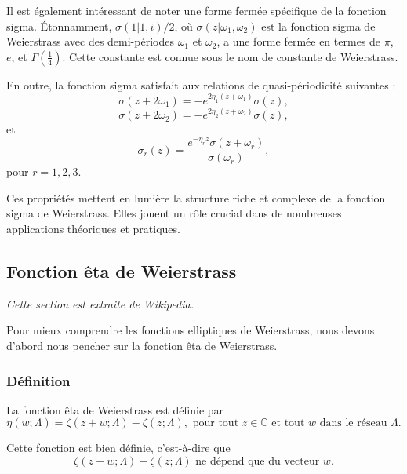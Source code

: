 \documentclass[12pt]{article}
\begin{document}
                        Il est également intéressant de noter une forme fermée spécifique de la fonction sigma. Étonnamment, $\sigma (1 | 1, i)/2$, où $\sigma (z | \omega_1, \omega_2)$ est la fonction sigma de Weierstrass avec des demi-périodes $\omega_1$ et $\omega_2$, a une forme fermée en termes de $\pi$, $e$, et $\Gamma \left( \frac{1}{4} \right)$. Cette constante est connue sous le nom de constante de Weierstrass.

                        En outre, la fonction sigma satisfait aux relations de quasi-périodicité suivantes :
                        \[
                        \sigma (z + 2 \omega_1) = -e^{2 \eta_1 (z + \omega_1)} \sigma (z), \tag{4}
                        \]
                        \[
                        \sigma (z + 2 \omega_2) = -e^{2 \eta_2 (z + \omega_2)} \sigma (z), \tag{5}
                        \]
                        et
                        \[
                        \sigma_r (z) = \frac{e^{-\eta_r z} \sigma (z + \omega_r)}{\sigma (\omega_r)}, \tag{6}
                        \]
                        pour $r = 1, 2, 3$.

                        Ces propriétés mettent en lumière la structure riche et complexe de la fonction sigma de Weierstrass. Elles jouent un rôle crucial dans de nombreuses applications théoriques et pratiques.


                        \subsection{Fonction êta de Weierstrass}
                        \textit{Cette section est extraite de Wikipedia.}

                        Pour mieux comprendre les fonctions elliptiques de Weierstrass, nous devons d'abord nous pencher sur la fonction êta de Weierstrass.

                        \subsubsection{Définition}

                        La fonction êta de Weierstrass est définie par
                        \[
                        \eta (w; \Lambda) = \zeta (z + w; \Lambda) - \zeta (z; \Lambda), \text{ pour tout } z \in \mathbb{C} \text{ et tout } w \text{ dans le réseau } \Lambda.
                        \]

                        Cette fonction est bien définie, c'est-à-dire que
                        \[
                        \zeta (z + w; \Lambda) - \zeta (z; \Lambda) \text{ ne dépend que du vecteur } w.
                        \]
\end{document}

